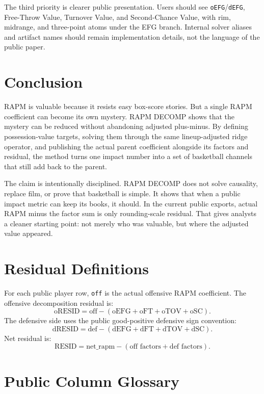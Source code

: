\documentclass[11pt]{article}
\begin{document}
The third priority is clearer public presentation.  Users should see
\texttt{oEFG}/\texttt{dEFG}, Free-Throw Value, Turnover Value, and
Second-Chance Value, with rim, midrange, and three-point atoms under the EFG
branch.  Internal solver aliases and artifact names should remain
implementation details, not the language of the public paper.

\section{Conclusion}

RAPM is valuable because it resists easy box-score stories.  But a single RAPM
coefficient can become its own mystery.  RAPM DECOMP shows that the mystery can
be reduced without abandoning adjusted plus-minus.  By defining possession-value
targets, solving them through the same lineup-adjusted ridge operator, and
publishing the actual parent coefficient alongside its factors and residual,
the method turns one impact number into a set of basketball channels that still
add back to the parent.

The claim is intentionally disciplined.  RAPM DECOMP does not solve causality,
replace film, or prove that basketball is simple.  It shows that when a public
impact metric can keep its books, it should.  In the current public exports,
actual RAPM minus the factor sum is only rounding-scale residual.  That gives
analysts a cleaner starting point: not merely who was valuable, but where the
adjusted value appeared.

\appendix

\section{Residual Definitions}

For each public player row, \texttt{off} is the actual offensive RAPM
coefficient.  The offensive decomposition residual is:
\[
\text{oRESID}
= \text{off}
- (\text{oEFG}+\text{oFT}+\text{oTOV}+\text{oSC}).
\]
The defensive side uses the public good-positive defensive sign convention:
\[
\text{dRESID}
= \text{def}
- (\text{dEFG}+\text{dFT}+\text{dTOV}+\text{dSC}).
\]
Net residual is:
\[
\text{RESID}
= \text{net\_rapm}
- (\text{off factors}+\text{def factors}).
\]

\section{Public Column Glossary}
\end{document}
